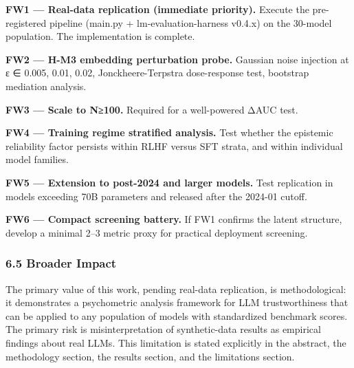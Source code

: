 \textbf{FW1 — Real-data replication (immediate priority).} Execute the pre-registered pipeline (main.py + lm-evaluation-harness v0.4.x) on the 30-model population. The implementation is complete.

\textbf{FW2 — H-M3 embedding perturbation probe.} Gaussian noise injection at ε ∈ {0.005, 0.01, 0.02}, Jonckheere-Terpstra dose-response test, bootstrap mediation analysis.

\textbf{FW3 — Scale to N≥100.} Required for a well-powered ΔAUC test.

\textbf{FW4 — Training regime stratified analysis.} Test whether the epistemic reliability factor persists within RLHF versus SFT strata, and within individual model families.

\textbf{FW5 — Extension to post-2024 and larger models.} Test replication in models exceeding 70B parameters and released after the 2024-01 cutoff.

\textbf{FW6 — Compact screening battery.} If FW1 confirms the latent structure, develop a minimal 2–3 metric proxy for practical deployment screening.

\subsubsection{6.5 Broader Impact}

The primary value of this work, pending real-data replication, is methodological: it demonstrates a psychometric analysis framework for LLM trustworthiness that can be applied to any population of models with standardized benchmark scores. The primary risk is misinterpretation of synthetic-data results as empirical findings about real LLMs. This limitation is stated explicitly in the abstract, the methodology section, the results section, and the limitations section.

